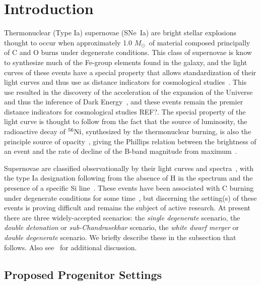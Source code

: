 \documentclass[iop,apj]{emulateapj}
\newcommand{\SNeIa}{SNe~Ia}
\newcommand{\Ni}[1]{\ensuremath{{}^{#1}{\rm Ni}}}
\newcommand{\Msun}{\ensuremath{M_\odot}}
\begin{document}
\section{Introduction}
\label{sec:intro}
Thermonuclear (Type Ia) supernovae (\SNeIa) are bright stellar explosions 
thought to occur when approximately 1.0 \Msun\ of material composed principally 
of C and O burns under degenerate conditions. This class of supernovae is
know to synthesize much of the Fe-group elements found in the galaxy, and
the light curves of these events have a special property that allows
standardization of their light curves and thus use
as distance indicators for cosmological studies~\citep{phillips:absolute}.
This use resulted in the discovery of the acceleration of the expansion of
the Universe and thus the inference of Dark 
Energy~\citep{riess.filippenko.ea:observational,
perlmutter.aldering.ea:measurements,leibundgut2001}, and these events
remain the premier distance indicators for cosmological studies {\color{red} REF?}. 
The special property of the light curve is thought to follow
from the fact that the source of luminosity, the radioactive decay
of \Ni{56}, synthesized by the thermonuclear burning, is also the
principle source of opacity~\citep{Pinto2001The-type-Ia-sup}, giving
the Phillips relation between the brightness of an event and the
rate of decline of the B-band magnitude from maximum~\citep{phillips:absolute}. 

Supernovae are classified observationally 
by their light curves and spectra~\citep{minkowski41,bertola64,porterfilippenko87,
wheelerharkness1990conf,Fili97}, with the type Ia designation following from
the absence of H in the spectrum and the presence of a specific Si 
line~\citep{filippenko:optical,hillebrandt.niemeyer:type}. These events
have been associated with C burning under degenerate conditions
for some time~\citep{hoylefowler60,arnett.truran.ea:nucleosynthesis},
but discerning the setting(s) of these events is proving difficult
and remains the subject of active research. At present there are three
widely-accepted scenarios: the {\em single degenerate} scenario,
the {\em double detonation} or {\em sub-Chandrasekhar} scenario, 
the {\em white dwarf merger} or {\em double degenerate} scenario.
We briefly describe these in the subsection that follows.
Also see~\citet{hillebrandt.niemeyer:type,howell2011,hillebrandtetal2013,calderetal2013,roepkesim2018}
for additional discussion.

\subsection{Proposed Progenitor Settings}
\end{document}
